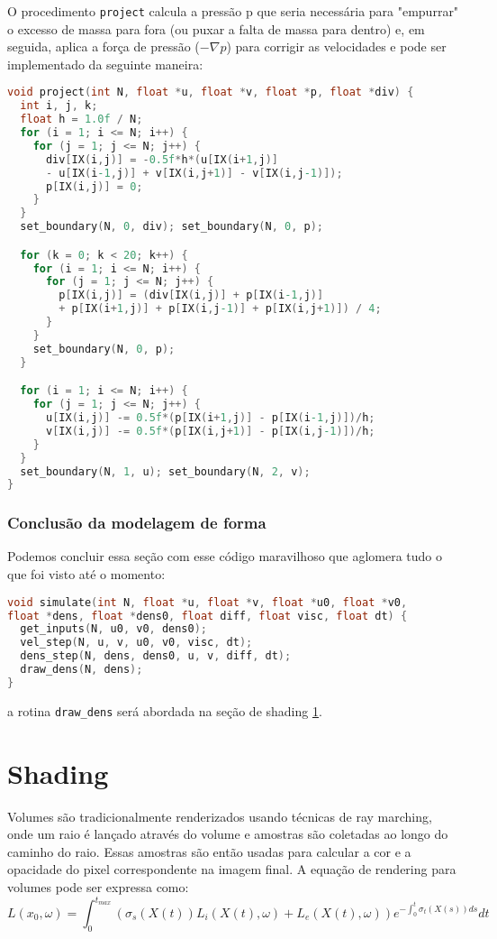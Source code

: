O procedimento \texttt{project} calcula a pressão p que seria necessária para "empurrar" o excesso de massa para fora (ou puxar a falta de massa para dentro) e, em seguida, aplica a força de pressão ($-\nabla p$) para corrigir as velocidades e pode ser implementado da seguinte maneira:

\begin{lstlisting}[language=C]
void project(int N, float *u, float *v, float *p, float *div) {
  int i, j, k;
  float h = 1.0f / N;
  for (i = 1; i <= N; i++) {
    for (j = 1; j <= N; j++) {
      div[IX(i,j)] = -0.5f*h*(u[IX(i+1,j)]
      - u[IX(i-1,j)] + v[IX(i,j+1)] - v[IX(i,j-1)]);
      p[IX(i,j)] = 0;
    }
  }
  set_boundary(N, 0, div); set_boundary(N, 0, p);

  for (k = 0; k < 20; k++) {
    for (i = 1; i <= N; i++) {
      for (j = 1; j <= N; j++) {
        p[IX(i,j)] = (div[IX(i,j)] + p[IX(i-1,j)]
        + p[IX(i+1,j)] + p[IX(i,j-1)] + p[IX(i,j+1)]) / 4;
      }
    }
    set_boundary(N, 0, p);
  }

  for (i = 1; i <= N; i++) {
    for (j = 1; j <= N; j++) {
      u[IX(i,j)] -= 0.5f*(p[IX(i+1,j)] - p[IX(i-1,j)])/h;
      v[IX(i,j)] -= 0.5f*(p[IX(i,j+1)] - p[IX(i,j-1)])/h;
    }
  }
  set_boundary(N, 1, u); set_boundary(N, 2, v);
}
\end{lstlisting}

\subsubsection{Conclusão da modelagem de forma}
Podemos concluir essa seção com esse código maravilhoso que aglomera tudo o que foi visto até o momento:

\begin{lstlisting}[language=C]
void simulate(int N, float *u, float *v, float *u0, float *v0,
float *dens, float *dens0, float diff, float visc, float dt) {
  get_inputs(N, u0, v0, dens0);
  vel_step(N, u, v, u0, v0, visc, dt);
  dens_step(N, dens, dens0, u, v, diff, dt);
  draw_dens(N, dens);
}
\end{lstlisting}

a rotina \texttt{draw\_dens} será abordada na seção de shading \ref{sec:shading}.

\section{Shading}
\label{sec:shading}

Volumes são tradicionalmente renderizados usando técnicas de ray marching, onde um raio é lançado através do volume e amostras são coletadas ao longo do caminho do raio. Essas amostras são então usadas para calcular a cor e a opacidade do pixel correspondente na imagem final. A equação de rendering para volumes pode ser expressa como:
$$
L(x_0, \omega) = \int_{0}^{t_{max}} (\sigma_s(X(t)) L_i(X(t), \omega) + L_e(X(t), \omega))e^{-\int_{0}^{t} \sigma_t(X(s)) ds} dt
$$

